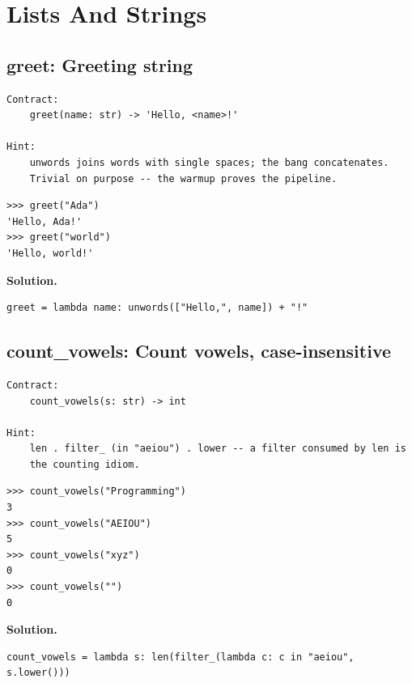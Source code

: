 \documentclass[10pt,letterpaper]{book}
\begin{document}
\chapter{Lists And Strings}

\section{greet: Greeting string}
\begin{lstlisting}[style=ex]
Contract:
    greet(name: str) -> 'Hello, <name>!'

Hint:
    unwords joins words with single spaces; the bang concatenates.
    Trivial on purpose -- the warmup proves the pipeline.
\end{lstlisting}
\begin{lstlisting}[style=ex]
>>> greet("Ada")
'Hello, Ada!'
>>> greet("world")
'Hello, world!'
\end{lstlisting}
\noindent\textbf{Solution.}
\begin{lstlisting}[style=code]
greet = lambda name: unwords(["Hello,", name]) + "!"
\end{lstlisting}

\section{count\_vowels: Count vowels, case-insensitive}
\begin{lstlisting}[style=ex]
Contract:
    count_vowels(s: str) -> int

Hint:
    len . filter_ (in "aeiou") . lower -- a filter consumed by len is
    the counting idiom.
\end{lstlisting}
\begin{lstlisting}[style=ex]
>>> count_vowels("Programming")
3
>>> count_vowels("AEIOU")
5
>>> count_vowels("xyz")
0
>>> count_vowels("")
0
\end{lstlisting}
\noindent\textbf{Solution.}
\begin{lstlisting}[style=code]
count_vowels = lambda s: len(filter_(lambda c: c in "aeiou", s.lower()))
\end{lstlisting}
\end{document}
